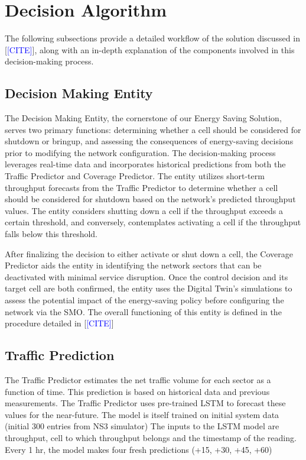 \section{Decision Algorithm}
\label{sec:algorithm}
 
The following subsections provide a detailed workflow of the solution discussed in [\textcolor{blue}{[CITE]}], along with an in-depth explanation of the components involved in this decision-making process.

\subsection{Decision Making Entity}

The Decision Making Entity, the cornerstone of our Energy Saving Solution, serves two primary functions: determining whether a cell should be considered for shutdown or bringup, and assessing the consequences of energy-saving decisions prior to modifying the network configuration. 
The decision-making process leverages real-time data and incorporates historical predictions from both the Traffic Predictor and Coverage Predictor.
The entity utilizes short-term throughput forecasts from the Traffic Predictor to determine whether a cell should be considered for shutdown based on the network's predicted throughput values.
The entity considers shutting down a cell if the throughput exceeds a certain threshold, and conversely, contemplates activating a cell if the throughput falls below this threshold.

After finalizing the decision to either activate or shut down a cell, the Coverage Predictor aids the entity in identifying the network sectors that can be deactivated with minimal service disruption. 
Once the control decision and its target cell are both confirmed, the entity uses the Digital Twin's simulations to assess the potential impact of the energy-saving policy before configuring the network via the SMO.
The overall functioning of this entity is defined in the procedure detailed in [\textcolor{blue}{[CITE]}]\\



\subsection{Traffic Prediction}
The Traffic Predictor estimates the net traffic volume for each sector as a function of time. 
This prediction is based on historical data and previous measurements. The Traffic Predictor uses pre-trained LSTM to forecast these values for the near-future. 
The model is itself trained on initial system data (initial 300 entries from NS3 simulator)
The inputs to the LSTM model are throughput, cell to which throughput belongs and the timestamp of the reading.
Every 1 hr, the model makes four fresh predictions (+15, +30, +45, +60)

